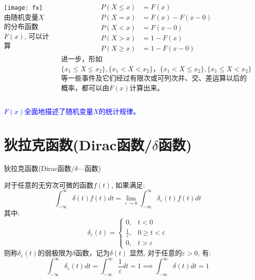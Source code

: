 \begin{frame}
\begin{columns}
\texttt{[image: fx]}
由随机变量$X$的分布函数$F(x)$, 可以计算
\begin{block}{}
\begin{align*}
P(X \le x) &= F(x)\\
P(X = x) &= F(x)-F(x-0) \\
P(X < x) &= F(x-0) \\
P(X > x) &= 1- F(x) \\
P(X \ge x) &= 1-F(x-0)
\end{align*}
进一步，形如$\{x_1\le X\le x_2\},\{x_1< X< x_2\}，\{x_1< X\le x_2\}, \{x_1\le X< x_2\}$等一些事件及它们经过有限次或可列次并、交、差运算以后的概率，都可以由$F(x)$计算出来。
\end{block}
\end{columns}
\begin{block}{}
\textcolor{blue}{$F(x)$全面地描述了随机变量$X$的统计规律。}
\end{block}
\end{frame}

\section{狄拉克函数(Dirac函数/$\delta$函数)}

\begin{frame}{狄拉克函数(Dirac函数/$\delta$---函数)}
\begin{definition}[$\delta$---函数]
	对于任意的无穷次可微的函数$f(t)$, 如果满足:
	$$\int_{-\infty}^{\infty}\delta (t)f(t)dt=\lim\limits_{\varepsilon\to 0}\int_{-\infty}^{\infty}\delta_{\varepsilon}(t)f(t)dt $$
	其中:
	\[
	\delta_{\varepsilon}(t)=\begin{cases}
	0,&t<0\\
	\frac{1}{\varepsilon}, & 0\ge t<\varepsilon\\
	0, &t>\varepsilon
	\end{cases}
	\]
	则称$\delta_\varepsilon(t)$的弱极限为$\delta$函数，记为$\delta(t)$
	显然, 对于任意的$\varepsilon>0$, 有:
	$$\int_{-\infty}^{\infty}\delta_{\varepsilon}(t)dt=\int_{-\infty}^\infty\frac{1}{\varepsilon}dt=1\implies \int_{-\infty}^\infty\delta(t)dt=1$$
\end{definition}
\end{frame}

